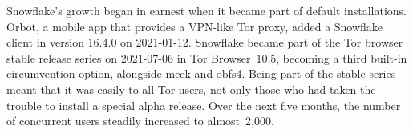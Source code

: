 \documentclass[letterpaper,twocolumn]{article}
\begin{document}
Snowflake's growth began in earnest
when it became part of default installations.
Orbot, a mobile app that provides a VPN-like Tor proxy,
added a Snowflake client in version 16.4.0
on \mbox{2021-01-12}.
Snowflake became part of the Tor browser stable release series
on \mbox{2021-07-06} in Tor Browser~10.5,
becoming a third built-in circumvention option,
alongside meek and obfs4.
Being part of the stable series meant that it was
easily to all Tor users,
not only those who had taken the trouble to install a special alpha release.
Over the next five months,
the number of concurrent users steadily increased
to almost~2,000.
\end{document}
